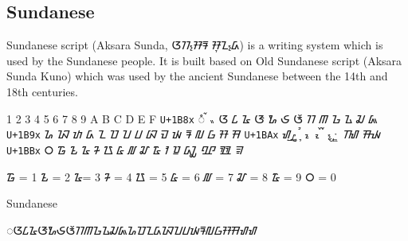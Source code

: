 \subsection{Sundanese}
\newfontfamily{}

\def\ublock#1{\texttt{{\arial #1}}}

Sundanese script (Aksara Sunda, {\sundanese ᮃᮊ᮪ᮞᮛ ᮞᮥᮔ᮪ᮓ}) is a writing system which is used by the Sundanese people. It is built based on Old Sundanese script (Aksara Sunda Kuno) which was used by the ancient Sundanese between the 14th and 18th centuries.

\bgroup
\sundanese
\obeylines

{	1	2	3	4	5	6	7	8	9	A	B	C	D	E	F}
\ublock{U+1B8x}	ᮀ	ᮁ	ᮂ	ᮃ	ᮄ	ᮅ	ᮆ	ᮇ	ᮈ	ᮉ	ᮊ	ᮋ	ᮌ	ᮍ	ᮎ	ᮏ
\ublock{U+1B9x}	ᮐ	ᮑ	ᮒ	ᮓ	ᮔ	ᮕ	ᮖ	ᮗ	ᮘ	ᮙ	ᮚ	ᮛ	ᮜ	ᮝ	ᮞ	ᮟ
\ublock{U+1BAx}	ᮠ	ᮡ	ᮢ	ᮣ	ᮤ	ᮥ	ᮦ	ᮧ	ᮨ	ᮩ	᮪	 ᮫ 	ᮬ	ᮭ	ᮮ	ᮯ
\ublock{U+1BBx}	᮰	᮱	᮲	᮳	᮴	᮵	᮶	᮷	᮸	᮹	ᮺ	ᮻ	ᮼ	ᮽ	ᮾ	ᮿ

᮱ {\arial= 1}	᮲ {\arial= 2}	᮳{\arial = 3}
᮴ {\arial= 4}	᮵ {\arial = 5} 	᮶ {\arial= 6}
᮷ {\arial= 7}	᮸ {\arial= 8}	᮹ {\arial= 9}
᮰ {\arial= 0}

\egroup
\begin{scriptexample}[]{Sundanese}
\bgroup
\sundanese
\centering

◌ᮃᮄᮅᮆᮇᮈᮉᮊᮋᮌᮍᮎᮏᮐᮕᮔᮓᮑᮖᮗᮚᮛᮜᮝᮞᮟᮠᮠ
\egroup
\end{scriptexample}